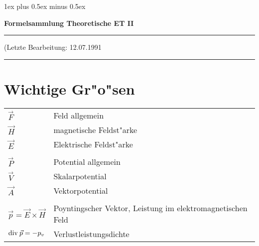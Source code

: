 %
% 
%   
\parskip1ex plus 0.5ex minus 0.5ex   \parindent0pt    \sloppy
\addtolength{\textheight}{5cm}       \addtolength{\textwidth}{3cm}
\addtolength{\topmargin}{-2cm}       \addtolength{\oddsidemargin}{-1.5cm}
\pagestyle{myheadings} 
\newcommand{\ROT}{{\rm rot \:}}                                         %
\newcommand{\DIV}{{\rm div \:}}                                         %
\newcommand{\GRAD}{{\rm grad \:}}                                       %
\newcommand{\INT}{\int\limits}                                          %
\newcommand{\IINT}{\int\!\!\!\!\int}                                    %
\newcommand{\IIINT}{\int\!\!\!\!\int\!\!\!\!\int}                       %
\newcommand{\OIINT}{\int\hspace{-4mm}\bigcirc\hspace{-4.2mm}\int}       %

\centerline{\Large\bf Formelsammlung Theoretische ET II} \bigskip\hrule\bigskip
\centerline{{\footnotesize (Letzte Bearbeitung: 12.07.1991}} \bigskip
\tableofcontents  \bigskip \hrule \bigskip
\section{Wichtige Gr"o"sen}
\begin{tabular*}{\textwidth}{l@{\extracolsep\fill}p{13cm}}
$\vec{F}$&Feld allgemein\\
$\vec{H}$&magnetische Feldst"arke\\
$\vec{E}$&Elektrische Feldst"arke\\
&\\
$\vec{P}$&Potential allgemein\\
$\vec{V}$&Skalarpotential\\
$\vec{A}$&Vektorpotential\\
&\\
$\vec{p}=\vec{E}\times\vec{H}$&Poyntingscher Vektor, Leistung im
          elektromagnetischen Feld\\
$\DIV \vec{p}=-p_v$&Verlustleistungsdichte\\
\end{tabular*}

